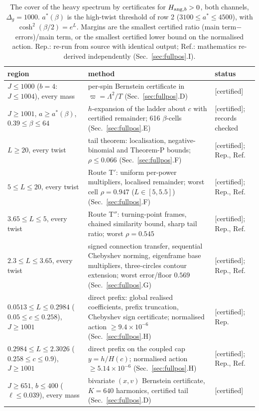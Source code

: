 \begin{table}[!htbp]
\caption{\label{tab:fpcover}The cover of the heavy spectrum by certificates for $H_{{\rm ang},b}>0$, both channels, $\Delta_g=1000$.
$a^*(\beta)$ is the high-twist threshold of row 2 ($3100\le a^*\le4500$), with $\cosh^2(\beta/2)=e^L$. Margins are the smallest
certified ratio (main term$-$errors)/main term, or the smallest certified lower bound on the normalised action. Rep.: re-run from source
with identical output; Ref.: mathematics re-derived independently (Sec.~\ref{sec:fullpos}.I).}
\footnotesize
\begin{ruledtabular}
\begin{tabular}{L{4.4cm}L{8.2cm}L{3.0cm}}
region & method & status\\\hline
$J\le1000$ ($b=4$: $J\le1004$), every mass & per-spin Bernstein certificate in $\varpi=\Lambda^2/T$ (Sec.~\ref{sec:fullpos}.D) & [certified]\\
$J\ge1001$, $a\ge a^*(\beta)$, $0.39\le\beta\le64$ & $h$-expansion of the ladder about $c$ with certified remainder; 616 $\beta$-cells (Sec.~\ref{sec:fullpos}.E) & [certified]; records checked\\
$L\ge20$, every twist & tail theorem: localisation, negative-binomial and Theorem-P bounds; $\rho\le0.066$ (Sec.~\ref{sec:fullpos}.F) & [certified]; Rep., Ref.\\
$5\le L\le20$, every twist & Route T$'$: uniform per-power multipliers, localised remainder; worst cell $\rho=0.947$ ($L\in[5,5.5]$) (Sec.~\ref{sec:fullpos}.F) & [certified]; Rep., Ref.\\
$3.65\le L\le5$, every twist & Route T$''$: turning-point frames, chained similarity bound, sharp tail ratio; worst $\rho=0.545$ & [certified]; Rep., Ref.\\
$2.3\le L\le3.65$, every twist & signed connection transfer, sequential Chebyshev norming, eigenframe base multipliers, three-circles contour extension; worst error/floor $0.569$ (Sec.~\ref{sec:fullpos}.G) & [certified]; Rep., Ref.\\
$0.0513\le L\le0.2984$ ($0.05\le c\le0.258$), $J\ge1001$ & direct prefix: global realised coefficients, prefix truncation, Chebyshev sign certificate; normalised action $\ge9.4\times10^{-6}$ (Sec.~\ref{sec:fullpos}.H) & [certified]; Rep.\\
$0.2984\le L\le2.3026$ ($0.258\le c\le0.9$), $J\ge1001$ & direct prefix on the coupled cap $y=h/H(c)$; normalised action $\ge5.14\times10^{-6}$ (Sec.~\ref{sec:fullpos}.H) & [certified]; Rep., Ref.\\
$J\ge651$, $\hat b\le400$ ($\ell\le0.039$), every mass & bivariate $(x,v)$ Bernstein certificate, $K=640$ harmonics, certified tail (Sec.~\ref{sec:fullpos}.D) & [certified]\\
\end{tabular}
\end{ruledtabular}
\end{table}

